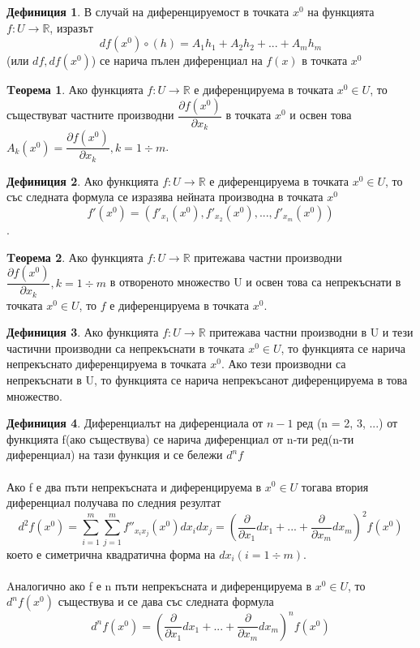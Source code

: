 \documentclass[a4paper,fleqn,12pt]{article}
\theoremstyle{definition}
\newtheorem{theorem}{Tеорема}[subsection]
\newtheorem{definition}{Дефиниция}[subsection]
\begin{document}
\begin{definition}
В случай на диференцируемост в точката $x^0$ на функцията $f: U \to \mathbb{R}$, изразът 
$$df(x^0) \circ (h) = A_1 h_1 + A_2 h_2 + ... + A_m h_m$$
(или $df, df(x^0)$) се нарича пълен диференциал на $f(x)$ в точката $x^0$
\end{definition}

\begin{theorem}
Ако функцията $f: U \to \mathbb{R}$ е диференцируема в точката $x^0 \in U$, то съществуват частните производни $\dfrac{\partial f(x^0)}{\partial x_k}$ в точката $x^0$ и освен това $A_k(x^0) = \dfrac{\partial f(x^0)}{\partial x_k}, k = 1 \div m$.
\end{theorem}

\begin{definition}
Ако функцията $f: U \to \mathbb{R}$ е диференцируема в точката $x^0 \in U$, то със следната формула се изразява нейната производна в точката $x^0$
$$f'(x^0) = (f'_{x_1}(x^0), f'_{x_2}(x^0), ..., f'_{x_m}(x^0))$$.

\end{definition}

\begin{theorem}
Ако функцията $f: U \to \mathbb{R}$ притежава частни производни $\dfrac{\partial f(x^0)}{\partial x_k}, k = 1 \div m$ в отвореното множество U и освен това са непрекъснати в точката $x^0 \in U$, то $f$ е диференцируема в точката $x^0$.
\end{theorem}

\begin{definition}
Ако функцията $f: U \to \mathbb{R}$ притежава частни производни в U и тези частични производни са непрекъснати в точката $x^0 \in U$, то функцията се нарича непрекъснато диференцируема в точката $x^0$. Ако тези производни са непрекъснати в U, то функцията се нарича непрекъсанот диференцируема в това множество. 
\end{definition}

\begin{definition}
Диференциалът на диференциала от $n-1$ ред (n = 2, 3, ...) от функцията f(ако съществува) се нарича диференциал от n-ти ред(n-ти диференциал) на тази функция и се бележи $d^n f$\\
\\
Ако f е два пъти непрекъсната и диференцируема в $x^0 \in U$ тогава втория диференциал получава по следния резултат
$$d^2 f(x^0) = \sum_{i=1}^ m \sum_{j=1}^m f''_{x_i x_j}(x^0) dx_i dx_j = \left( \dfrac{\partial}{\partial x_1}dx_1 + ... + \dfrac{\partial}{\partial x_m}dx_m\right )^2 f(x^0)$$
което е симетрична квадратична форма на $dx_i (i = 1 \div m)$. \\
\\
Aналогично ако f е n пъти непрекъсната и диференцируема в $x^0 \in U$, то $d^n f(x^0)$ съществува и се дава със следната формула 
$$d^n f(x^0) = \left( \dfrac{\partial}{\partial x_1}dx_1 + ... + \dfrac{\partial}{\partial x_m}dx_m\right )^n f(x^0)$$
\end{definition}
\end{document}
